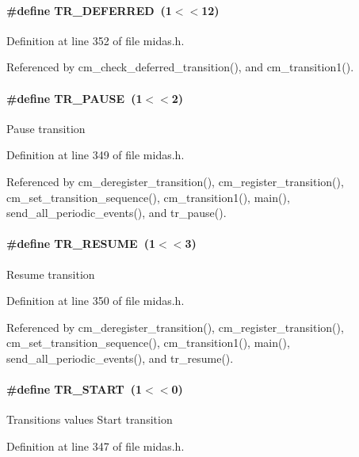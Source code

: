 \paragraph[{TR\_\-DEFERRED}]{\setlength{\rightskip}{0pt plus 5cm}\#define TR\_\-DEFERRED~(1$<$$<$12)}\hfill\label{group__mdefineh_gac2b685776825687ca4e4546ac5503fe5}


Definition at line 352 of file midas.h.

Referenced by cm\_\-check\_\-deferred\_\-transition(), and cm\_\-transition1().
\paragraph[{TR\_\-PAUSE}]{\setlength{\rightskip}{0pt plus 5cm}\#define TR\_\-PAUSE~(1$<$$<$2)}\hfill\label{group__mdefineh_ga11713399cfb35e58b8fae045836c0d88}
Pause transition 

Definition at line 349 of file midas.h.

Referenced by cm\_\-deregister\_\-transition(), cm\_\-register\_\-transition(), cm\_\-set\_\-transition\_\-sequence(), cm\_\-transition1(), main(), send\_\-all\_\-periodic\_\-events(), and tr\_\-pause().
\paragraph[{TR\_\-RESUME}]{\setlength{\rightskip}{0pt plus 5cm}\#define TR\_\-RESUME~(1$<$$<$3)}\hfill\label{group__mdefineh_ga0b69b728877f100fe6ff76e667ff8831}
Resume transition 

Definition at line 350 of file midas.h.

Referenced by cm\_\-deregister\_\-transition(), cm\_\-register\_\-transition(), cm\_\-set\_\-transition\_\-sequence(), cm\_\-transition1(), main(), send\_\-all\_\-periodic\_\-events(), and tr\_\-resume().
\paragraph[{TR\_\-START}]{\setlength{\rightskip}{0pt plus 5cm}\#define TR\_\-START~(1$<$$<$0)}\hfill\label{group__mdefineh_ga2abbc514b87837cc235da54a4cf59e09}
Transitions values Start transition 

Definition at line 347 of file midas.h.

